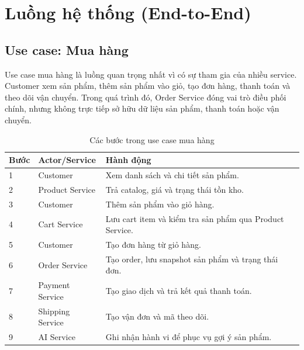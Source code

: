 \documentclass[../main.tex]{subfiles}
\begin{document}
\section{Luồng hệ thống (End-to-End)}
\label{section:4.7}

\subsection{Use case: Mua hàng}
\label{subsection:4.7.1}

Use case mua hàng là luồng quan trọng nhất vì có sự tham gia của nhiều service. Customer xem sản phẩm, thêm sản phẩm vào giỏ, tạo đơn hàng, thanh toán và theo dõi vận chuyển. Trong quá trình đó, Order Service đóng vai trò điều phối chính, nhưng không trực tiếp sở hữu dữ liệu sản phẩm, thanh toán hoặc vận chuyển.

\begin{table}[H]
    \centering
    \caption{Các bước trong use case mua hàng}
    \label{tab:chapter4-purchase-use-case}
    \begin{tabular}{|p{}|p{}|p{}|}
        \hline
        \rowcolor{primary!35}
        \textbf{Bước} & \textbf{Actor/Service} & \textbf{Hành động} \\
        \hline
        1 & Customer & Xem danh sách và chi tiết sản phẩm. \\
        \hline
        2 & Product Service & Trả catalog, giá và trạng thái tồn kho. \\
        \hline
        3 & Customer & Thêm sản phẩm vào giỏ hàng. \\
        \hline
        4 & Cart Service & Lưu cart item và kiểm tra sản phẩm qua Product Service. \\
        \hline
        5 & Customer & Tạo đơn hàng từ giỏ hàng. \\
        \hline
        6 & Order Service & Tạo order, lưu snapshot sản phẩm và trạng thái đơn. \\
        \hline
        7 & Payment Service & Tạo giao dịch và trả kết quả thanh toán. \\
        \hline
        8 & Shipping Service & Tạo vận đơn và mã theo dõi. \\
        \hline
        9 & AI Service & Ghi nhận hành vi để phục vụ gợi ý sản phẩm. \\
        \hline
    \end{tabular}
\end{table}
\end{document}
